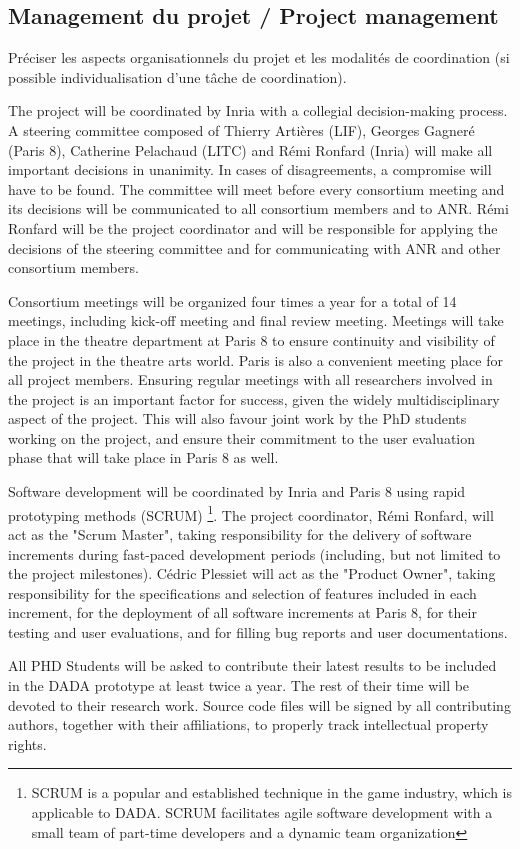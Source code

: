 
\subsection{Management du projet / Project management}
\begin{xcomment}  
Pr\'eciser les aspects organisationnels du projet et les modalit\'es de coordination (si possible individualisation d'une tâche de coordination).
\end{xcomment}


The project will be coordinated by Inria with a collegial decision-making process. A steering committee composed of Thierry Arti\`eres (LIF), 
Georges Gagner\'e (Paris 8), Catherine Pelachaud (LITC) and R\'emi Ronfard (Inria) will make all important decisions  in unanimity. In cases 
of disagreements,  a compromise will have to be found. The committee will meet before every consortium meeting and its decisions will be 
communicated to all consortium members and to ANR. R\'emi Ronfard will be the project coordinator and will be responsible for applying
the decisions of the steering committee and for communicating with ANR and other consortium members. 

Consortium meetings will be organized four times a year for a total of 14 meetings, including kick-off meeting and final review meeting. 
Meetings will take place in the theatre department at Paris 8 to ensure continuity and visibility of the project in the theatre arts world. Paris is also 
a convenient meeting place for all project members. Ensuring regular meetings with all researchers involved in the project is an important
factor for success, given the widely multidisciplinary aspect of the project. This will also favour joint work by the PhD students working
on the project, and ensure their commitment to the user evaluation phase that will take place in Paris 8 as well. 

Software development will be coordinated by Inria and Paris 8 using rapid prototyping methods (SCRUM) \footnote{SCRUM is a popular
and established technique in the game industry, which is applicable to DADA. SCRUM facilitates agile software development
with a small team of part-time developers and a dynamic team organization}. The project coordinator, R\'emi Ronfard,
will act as the "Scrum Master", taking responsibility for the delivery of software increments during fast-paced development periods (including, but not limited to 
the project milestones). C\'edric Plessiet will act as the "Product Owner", taking responsibility for the specifications and selection of features included in each increment,
for the deployment of all software increments at Paris 8, for their testing and user evaluations, and for filling bug reports and user documentations.

All PHD Students will be asked to contribute their latest results to be included in the DADA prototype at least twice a year. 
The rest of their time will be devoted to their research work. Source code files will be signed by all contributing authors, 
together with their affiliations, to properly  track intellectual property rights.



\endinput

